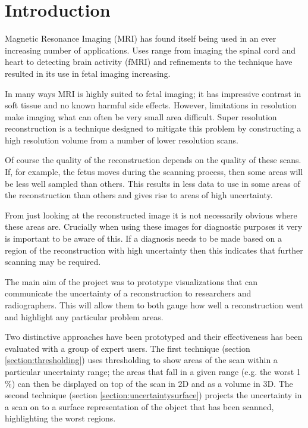 \chapter{Introduction}\label{chapter:introduction}


Magnetic Resonance Imaging (MRI) has found itself being used in an ever increasing number of applications. Uses range from imaging the spinal cord and heart to detecting brain activity (fMRI) and refinements to the technique have resulted in its use in fetal imaging increasing.

In many ways MRI is highly suited to fetal imaging; it has impressive contrast in soft tissue and no known harmful side effects. However, limitations in resolution make imaging what can often be very small area difficult. Super resolution reconstruction is a technique designed to mitigate this problem by constructing a high resolution volume from a number of lower resolution scans.

Of course the quality of the reconstruction depends on the quality of these scans. If, for example, the fetus moves during the scanning process, then some areas will be less well sampled than others. This results in less data to use in some areas of the reconstruction than others and gives rise to areas of high uncertainty.
 
From just looking at the reconstructed image it is not necessarily obvious where these areas are. Crucially when using these images for diagnostic purposes it very is important to be aware of this. If a diagnosis needs to be made based on a region of the reconstruction with high uncertainty then this indicates that further scanning may be required.


The main aim of the project was to prototype visualizations that can communicate the uncertainty of a reconstruction to researchers and radiographers. This will allow them to both gauge how well a reconstruction went and highlight any particular problem areas.

Two distinctive approaches have been prototyped and their effectiveness has been evaluated with a group of expert users. The first technique (section \ref{section:thresholding}) uses thresholding to show areas of the scan within a particular uncertainty range; the areas that fall in a given range (e.g. the worst 1$\%$) can then be displayed on top of the scan in 2D and as a volume in 3D. The second technique (section \ref{section:uncertaintysurface}) projects the uncertainty in a scan on to a surface representation of the object that has been scanned, highlighting the worst regions.

